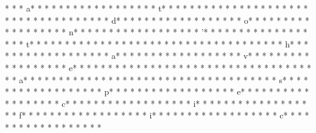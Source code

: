 * *  * a* * *  * * *  * * *  *  * * *  *  * * *  * t* * *  * * *  * * *  *  * * *  *  * * *  *  * * *  * * *  * * *  *  * * *  *  * * *  * d* * *  * * *  * * *  *  * * *  *  * * *  * o* * *  * * *  * * *  *  * * *  *  * * *  * n* * *  * * *  * * *  *  * * *  *  * * *  * ’* * *  * * *  * * *  *  * * *  *  * * *  * t* * *  * * *  * * *  *  * * *  *  * * *  *  * * *  * * *  * * *  *  * * *  *  * * *  * h* * *  * * *  * * *  *  * * *  *  * * *  * a* * *  * * *  * * *  *  * * *  *  * * *  * v* * *  * * *  * * *  *  * * *  *  * * *  * e* * *  * * *  * * *  *  * * *  *  * * *  *  * * *  * * *  * * *  *  * * *  *  * * *  * a* * *  * * *  * * *  *  * * *  *  * * *  *  * * *  * * *  * * *  *  * * *  *  * * *  * s* * *  * * *  * * *  *  * * *  *  * * *  * p* * *  * * *  * * *  *  * * *  *  * * *  * e* * *  * * *  * * *  *  * * *  *  * * *  * c* * *  * * *  * * *  *  * * *  *  * * *  * i* * *  * * *  * * *  *  * * *  *  * * *  * f* * *  * * *  * * *  *  * * *  *  * * *  * i* * *  * * *  * * *  *  * * *  *  * * *  * c* * *  * * *  * * *  *  * * *  *  * * *  * 
